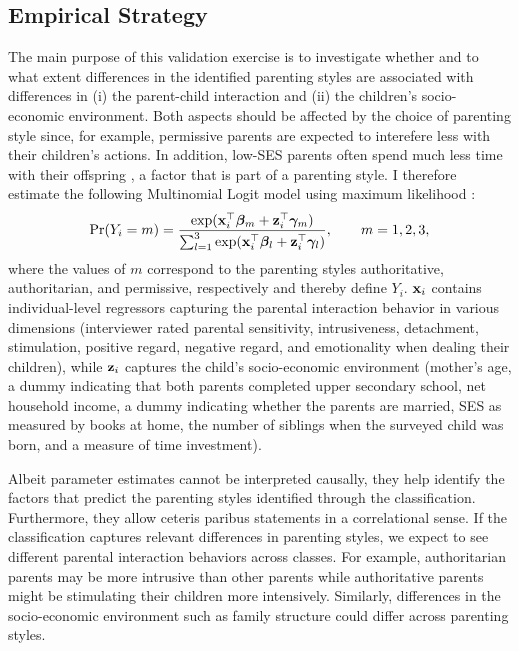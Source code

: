 \subsection{Empirical Strategy}
The main purpose of this validation exercise is to investigate whether and to what extent differences in the identified parenting styles are associated with differences in (i) the parent-child interaction and (ii) the children's socio-economic environment. Both aspects should be affected by the choice of parenting style since, for example, permissive parents are expected to interefere less with their children's actions. In addition, low-SES parents often spend much less time with their offspring \parencite[e.g.][]{falkSocioEconomicStatusInequalities2021}, a factor that is part of a parenting style. I therefore estimate the following Multinomial Logit model using maximum likelihood \parencite[see][chapter 15]{cameronMicroeconometricsMethodsApplications2005}:
\begin{equation}
	\text{Pr}(Y_i = m) = \frac{\exp(\textbf{x}^\top_{i} \bm{\beta}_m + \textbf{z}^\top_{i} \bm{\gamma}_m)}{\sum_{l=1}^{3} \exp(\textbf{x}^\top_{i}\bm{\beta}_l + \textbf{z}^\top_{i} \bm{\gamma}_l)}, \qquad m = 1, 2, 3, \label{eq:multinom}
\end{equation}
where the values of $m$ correspond to the parenting styles authoritative, authoritarian, and permissive, respectively and thereby define $Y_i$. $\textbf{x}_i$ contains individual-level regressors capturing the parental interaction behavior in various dimensions (interviewer rated parental sensitivity, intrusiveness, detachment, stimulation, positive regard, negative regard, and emotionality when dealing their children), while $\textbf{z}_i$ captures the child's socio-economic environment (mother's age, a dummy indicating that both parents completed upper secondary school, net household income, a dummy indicating whether the parents are married, SES as measured by books at home, the number of siblings when the surveyed child was born, and a measure of time investment).

Albeit parameter estimates cannot be interpreted causally, they help identify the factors that predict the parenting styles identified through the classification. Furthermore, they allow ceteris paribus statements in a correlational sense. If the classification captures relevant differences in parenting styles, we expect to see different parental interaction behaviors across classes. For example, authoritarian parents may be more intrusive than other parents while authoritative parents might be stimulating their children more intensively. Similarly, differences in the socio-economic environment such as family structure could differ across parenting styles.
